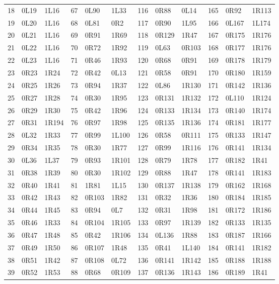\begin{longtable}{@{}rllrllrllrll@{}}
18 & 0L19 & 1L16 & 67 & 0L90 & 1L33 & 116 & 0R88 & 0L14 & 165 & 0R92 & 1R113\\
19 & 0L20 & 1L16 & 68 & 0L81 & 0R2 & 117 & 0R90 & 1L95 & 166 & 0L167 & 1L174\\
20 & 0L21 & 1L16 & 69 & 0R91 & 1R69 & 118 & 0R129 & 1R47 & 167 & 0R175 & 1R176\\
21 & 0L22 & 1L16 & 70 & 0R72 & 1R92 & 119 & 0L63 & 0R103 & 168 & 0R177 & 1R176\\
22 & 0L23 & 1L16 & 71 & 0R46 & 1R93 & 120 & 0R68 & 0R91 & 169 & 0R178 & 1R179\\
23 & 0R23 & 1R24 & 72 & 0R42 & 0L13 & 121 & 0R58 & 0R91 & 170 & 0R180 & 1R159\\
24 & 0R25 & 1R26 & 73 & 0R94 & 1R37 & 122 & 0L86 & 1R130 & 171 & 0R142 & 1R136\\
25 & 0R27 & 1R28 & 74 & 0R30 & 1R95 & 123 & 0R131 & 1R132 & 172 & 0L110 & 1R124\\
26 & 0R29 & 1R30 & 75 & 0R42 & 1R96 & 124 & 0R133 & 1R134 & 173 & 0R140 & 1R174\\
27 & 0R31 & 1R194 & 76 & 0R97 & 1R98 & 125 & 0R135 & 1R136 & 174 & 0R181 & 1R177\\
28 & 0L32 & 1R33 & 77 & 0R99 & 1L100 & 126 & 0R58 & 0R111 & 175 & 0R133 & 1R147\\
29 & 0R34 & 1R35 & 78 & 0R30 & 1R77 & 127 & 0R99 & 1R116 & 176 & 0R141 & 1R134\\
30 & 0L36 & 1L37 & 79 & 0R93 & 1R101 & 128 & 0R79 & 1R78 & 177 & 0R182 & 1R41\\
31 & 0R38 & 1R39 & 80 & 0R30 & 1R102 & 129 & 0R88 & 1R47 & 178 & 0R141 & 1R183\\
32 & 0R40 & 1R41 & 81 & 1R81 & 1L15 & 130 & 0R137 & 1R138 & 179 & 0R162 & 1R168\\
33 & 0R42 & 1R43 & 82 & 0R103 & 1R82 & 131 & 0R32 & 1R36 & 180 & 0R184 & 1R185\\
34 & 0R44 & 1R45 & 83 & 0R94 & 0L7 & 132 & 0R31 & 1R98 & 181 & 0R172 & 1R186\\
35 & 0R46 & 1R33 & 84 & 0R104 & 1R105 & 133 & 0R97 & 1R139 & 182 & 0R133 & 1R135\\
36 & 0R47 & 1R48 & 85 & 0R42 & 1R106 & 134 & 0L136 & 1R88 & 183 & 0R187 & 1R166\\
37 & 0R49 & 1R50 & 86 & 0R107 & 1R48 & 135 & 0R41 & 1L140 & 184 & 0R141 & 1R182\\
38 & 0R51 & 1R42 & 87 & 0R108 & 0L72 & 136 & 0R141 & 1R142 & 185 & 0R188 & 1R188\\
39 & 0R52 & 1R53 & 88 & 0R68 & 0R109 & 137 & 0R136 & 1R143 & 186 & 0R189 & 1R41\\

\end{longtable}
